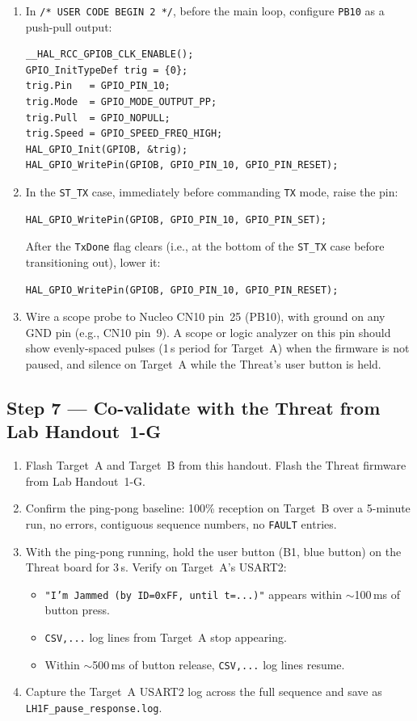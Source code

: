 \documentclass[11pt,letterpaper]{article}
\begin{document}
\begin{enumerate}[leftmargin=2em]
	\item In \texttt{/* USER CODE BEGIN 2 */}, before the main loop, configure \texttt{PB10} as a push-pull output:
\begin{verbatim}
__HAL_RCC_GPIOB_CLK_ENABLE();
GPIO_InitTypeDef trig = {0};
trig.Pin   = GPIO_PIN_10;
trig.Mode  = GPIO_MODE_OUTPUT_PP;
trig.Pull  = GPIO_NOPULL;
trig.Speed = GPIO_SPEED_FREQ_HIGH;
HAL_GPIO_Init(GPIOB, &trig);
HAL_GPIO_WritePin(GPIOB, GPIO_PIN_10, GPIO_PIN_RESET);
\end{verbatim}
	\item In the \texttt{ST\_TX} case, immediately before commanding \texttt{TX} mode, raise the pin:
\begin{verbatim}
HAL_GPIO_WritePin(GPIOB, GPIO_PIN_10, GPIO_PIN_SET);
\end{verbatim}
	After the \texttt{TxDone} flag clears (i.e., at the bottom of the \texttt{ST\_TX} case before transitioning out), lower it:
\begin{verbatim}
HAL_GPIO_WritePin(GPIOB, GPIO_PIN_10, GPIO_PIN_RESET);
\end{verbatim}
	\item Wire a scope probe to Nucleo CN10 pin~25 (PB10), with ground on any GND pin (e.g., CN10 pin~9). A scope or logic analyzer on this pin should show evenly-spaced pulses (1\,s period for Target~A) when the firmware is not paused, and silence on Target~A while the Threat's user button is held.
\end{enumerate}

\newpage
\subsection{Step 7 --- Co-validate with the Threat from Lab Handout~1-G}

\begin{enumerate}[leftmargin=2em]
	\item Flash Target~A and Target~B from this handout. Flash the Threat firmware from Lab Handout~1-G.
	\item Confirm the ping-pong baseline: 100\% reception on Target~B over a 5-minute run, no \CRC{} errors, contiguous sequence numbers, no \texttt{FAULT} entries.
	\item With the ping-pong running, hold the user button (B1, blue button) on the Threat board for 3\,s. Verify on Target~A's USART2:
	\begin{itemize}[leftmargin=1.2em]
		\item \texttt{"I'm Jammed (by ID=0xFF, until t=...)"} appears within $\sim$100\,ms of button press.
		\item \texttt{CSV,...} log lines from Target~A stop appearing.
		\item Within $\sim$500\,ms of button release, \texttt{CSV,...} log lines resume.
	\end{itemize}
	\item Capture the Target~A USART2 log across the full sequence and save as \texttt{LH1F\_pause\_response.log}.
\end{enumerate}
\end{document}
